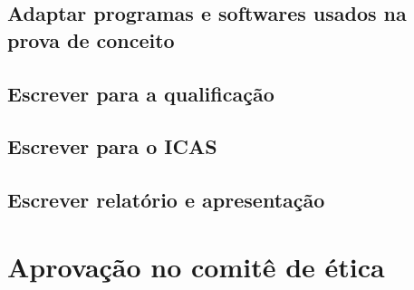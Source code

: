 \documentclass{article}
\begin{document}
\subsection{Adaptar programas e softwares usados na prova de conceito}
\subsection{Escrever para a qualificação}
\subsection{Escrever para o ICAS}
\subsection{Escrever relatório e apresentação}
\section{Aprovação no comitê de ética}



\end{document}
